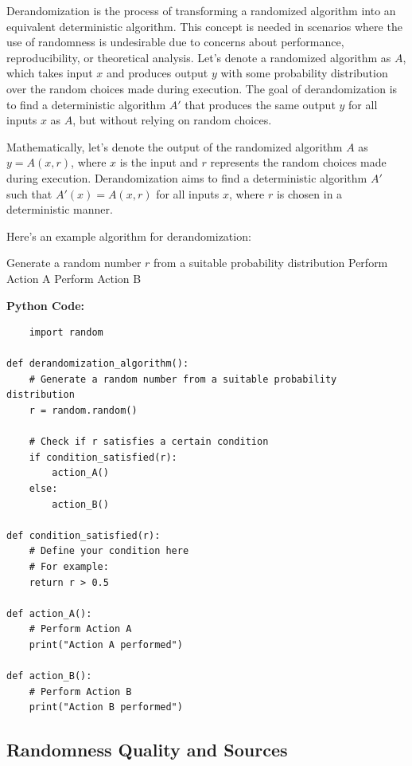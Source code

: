 \documentclass[12pt]{book} %
\begin{document}
Derandomization is the process of transforming a randomized algorithm into an equivalent deterministic algorithm. This concept is needed in scenarios where the use of randomness is undesirable due to concerns about performance, reproducibility, or theoretical analysis. Let's denote a randomized algorithm as \(A\), which takes input \(x\) and produces output \(y\) with some probability distribution over the random choices made during execution. The goal of derandomization is to find a deterministic algorithm \(A'\) that produces the same output \(y\) for all inputs \(x\) as \(A\), but without relying on random choices.

Mathematically, let's denote the output of the randomized algorithm \(A\) as \(y = A(x, r)\), where \(x\) is the input and \(r\) represents the random choices made during execution. Derandomization aims to find a deterministic algorithm \(A'\) such that \(A'(x) = A(x, r)\) for all inputs \(x\), where \(r\) is chosen in a deterministic manner.


Here's an example algorithm for derandomization:
\FloatBarrier
\begin{algorithm}[H]
\caption{Derandomization Algorithm}
\begin{algorithmic}[1]
\State Generate a random number $r$ from a suitable probability distribution
    \State Perform Action A
\Else
    \State Perform Action B
\EndIf
\end{algorithmic}
\end{algorithm}
\FloatBarrier
\textbf{Python Code:}
\FloatBarrier
\begin{lstlisting}
    import random

def derandomization_algorithm():
    # Generate a random number from a suitable probability distribution
    r = random.random()
    
    # Check if r satisfies a certain condition
    if condition_satisfied(r):
        action_A()
    else:
        action_B()

def condition_satisfied(r):
    # Define your condition here
    # For example:
    return r > 0.5

def action_A():
    # Perform Action A
    print("Action A performed")

def action_B():
    # Perform Action B
    print("Action B performed")
\end{lstlisting}

\subsection{Randomness Quality and Sources}
\end{document}
